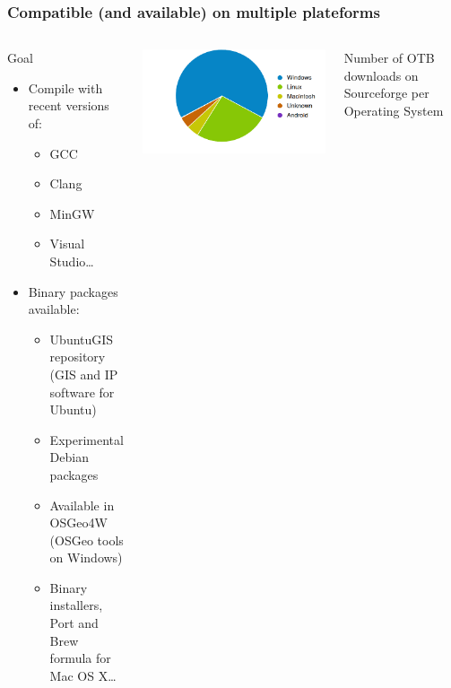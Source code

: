 \documentclass[8pt]{beamer}
\begin{document}
\begin{frame}
\frametitle{Compatible (and available) on multiple plateforms}
\begin{columns}
\begin{block}{Goal}
\begin{itemize}
\item Compile with recent versions of:
\begin{itemize}
\item GCC
\item Clang
\item MinGW
\item Visual Studio\ldots
\end{itemize}
\item Binary packages available:
\begin{itemize}
\item UbuntuGIS repository (GIS and IP software for Ubuntu)
\item Experimental Debian packages 
\item Available in  OSGeo4W (OSGeo tools on Windows)
\item Binary installers, Port and Brew formula for Mac OS X\ldots
\end{itemize}
\end{itemize}
\end{block}
\includegraphics[width=\textwidth]{images/OTB4_download_sourceforge_os_crop.png}
\begin{center}
\tiny{Number of OTB downloads on Sourceforge per Operating System}
\end{center}
\end{columns}
\end{frame}
\end{document}
